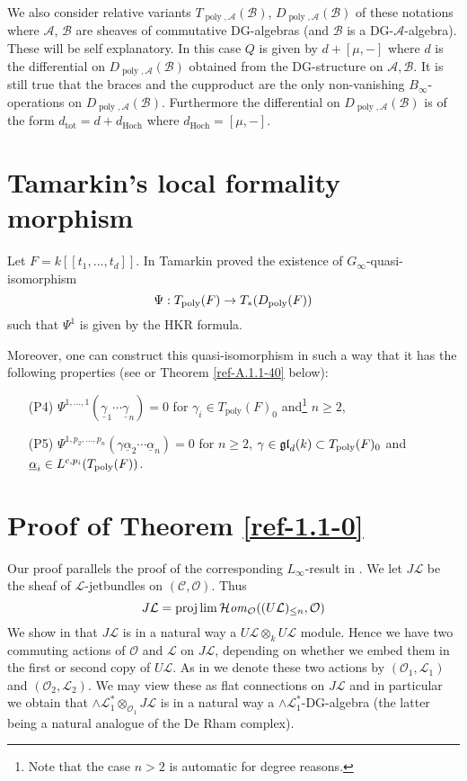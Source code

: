 \documentclass{amsart}
\numberwithin{equation}{section}
\let\cal\mathcal
\let\invlim\projlim
\theoremstyle{definition}
\theoremstyle{remark}
\begin{document}
We also consider relative variants $T_{{\operatorname{poly}},{{\cal A}}}({{\cal B}})$,
$D_{{\operatorname{poly}},{{\cal A}}}({{\cal B}})$ of these notations where ${{\cal A}}$, ${{\cal B}}$ are
sheaves of commutative DG-algebras (and ${{\cal B}}$ is a
DG-${{\cal A}}$-algebra). These will be self explanatory. In this case $Q$
is given by $d+[\mu,-]$ where $d$ is the differential on
$D_{{\operatorname{poly}},{{\cal A}}}({{\cal B}})$ obtained from the DG-structure on
${{\cal A}},{{\cal B}}$.  It is still true that the braces and the cupproduct
are the only non-vanishing $B_\infty$-operations on
$D_{{\operatorname{poly}},{{\cal A}}}({{\cal B}})$. Furthermore the differential on
$D_{{\operatorname{poly}},{{\cal A}}}({{\cal B}})$ is of the form $d_{\text{tot}}=d+d_{\text{Hoch}}$ where
$d_{\text{Hoch}}=[\mu,-]$.
\section{Tamarkin's local formality morphism}
\label{ref-9-31}
Let $F=k[[t_1,\dots,t_d]]$. In \cite{Tamarkin} Tamarkin proved the existence
of $G_\infty$-quasi-isomorphism 
\[
\Psi:T_{\rm poly}(F)\to T_\ast(D_{\rm poly}(F))
\]
such that $\Psi^{1}$ is given by the HKR formula.

Moreover, one can construct this quasi-isomorphism in such a way that 
it has the following properties (see \cite[Theorem 4.5]{halb} or Theorem \ref{ref-A.1.1-40} below): 
\begin{itemize}
\item[(P4)] $\Psi^{1,\dots,1}(\underline{\gamma}_1\cdots\underline{\gamma}_n)=0$ for 
$\gamma_i\in T_{\operatorname{poly}}(F)_0$ and\footnote{Note that the case $n>2$
is automatic for degree reasons.} $n\ge 2$, 
\item[(P5)] $\Psi^{1,p_2,\dots,p_n}(\gamma\underline{\alpha}_2\cdots\underline{\alpha}_n)=0$ for $n\geq2$, 
$\gamma\in\mathfrak{gl}_d(k)\subset T_{\rm poly}(F)_0$ and $\underline{\alpha}_i\in L^{c,p_i}(T_{\rm poly}(F))$. 
\end{itemize}
\section{Proof of Theorem \ref{ref-1.1-0}}
Our proof parallels the proof of the corresponding $L_\infty$-result
in \cite{vdbcalaque}. We let $J{{\cal L}}$ be the sheaf of
${{\cal L}}$-jetbundles on $({{\cal C}},{{\cal O}})$. Thus
\[
J{{\cal L}}=\invlim {\operatorname {\mathcal{H}\mathit{om}}}_{{\cal O}}((U{{\cal L}})_{\le n},{{\cal O}})
\]
We show in \cite{vdbcalaque} that $J{{\cal L}}$ is in a natural way a
$U{{\cal L}}\otimes_k U{{\cal L}}$ module.  Hence we have two commuting actions
of ${{\cal O}}$ and ${{\cal L}}$ on $J{{\cal L}}$, depending on whether we embed them
in the first or second copy of $U{{\cal L}}$. As in \cite{vdbcalaque} we
denote these two actions by $({{\cal O}}_1,{{\cal L}}_1)$ and
$({{\cal O}}_2,{{\cal L}}_2)$. We may view these as flat connections on $J{{\cal L}}$
and in particular we obtain that $\wedge {{\cal L}}_1^\ast\otimes_{{{\cal O}}_1}
J{{\cal L}}$ is in a natural way a $\wedge{{\cal L}}_1^\ast$-DG-algebra (the
latter being a natural analogue of the De Rham complex).
\end{document}
